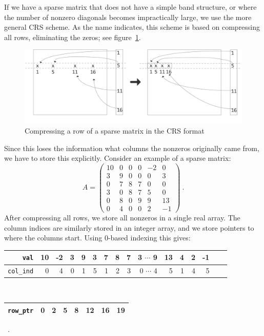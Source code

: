 If we have a sparse matrix that does not have a simple band structure,
or where the number of nonzero diagonals becomes impractically large,
we use the more general \acf{CRS} scheme. As the name indicates, this
scheme is based on compressing all rows, eliminating the zeros; see
figure~\ref{fig:crs}.
\begin{figure}[ht]
  \includegraphics[scale=.13]{graphics/crs}
  \caption{Compressing a row of a sparse matrix in the CRS format}
  \label{fig:crs}
\end{figure}
Since this loses the information what columns the nonzeros originally
came from, we have to store this explicitly.
Consider an example of a sparse matrix:
\begin{equation}
A =
\left(\begin{array}{rrrrrr}
      10 &  0 &  0 & 0  &-2 &  0 \\
       3 &  9 &  0 & 0  & 0 &  3 \\
       0 &  7 &  8 & 7  & 0 &  0 \\
       3 &  0 &  8 & 7  & 5 &  0 \\
       0 &  8 &  0 & 9  & 9 & 13 \\
       0 &  4 &  0 & 0  & 2 & -1
           \end{array}
\right) ~.
\end{equation}
After compressing all rows, we store all
nonzeros in a single real array. The column indices are
similarly stored in an integer array, and we store pointers to where
the columns start. Using 0-based indexing this gives:
\begin{center}
\begin{tabular}{|r|r|r|r|r|r|r|r|r|r|r|r|r|r|r|r|} \hline
{\tt val}     &10 &-2& 3& 9& 3& 7& 8& 7& 3 $\cdots$  9&13& 4& 2&-1 \\ \hline
{\tt col\_ind}& 0 & 4& 0& 1& 5& 1& 2& 3& 0 $\cdots$  4& 5& 1& 4& 5 \\ \hline
\end{tabular} \\
\vspace{.02 in}
\begin{tabular}{|r|r|r|r|r|r|r|r|} \hline
{\tt row\_ptr}& 0 & 2 & 5 & 8 & 12 & 16 & 19  \\ \hline
\end{tabular} ~.
\end{center}
